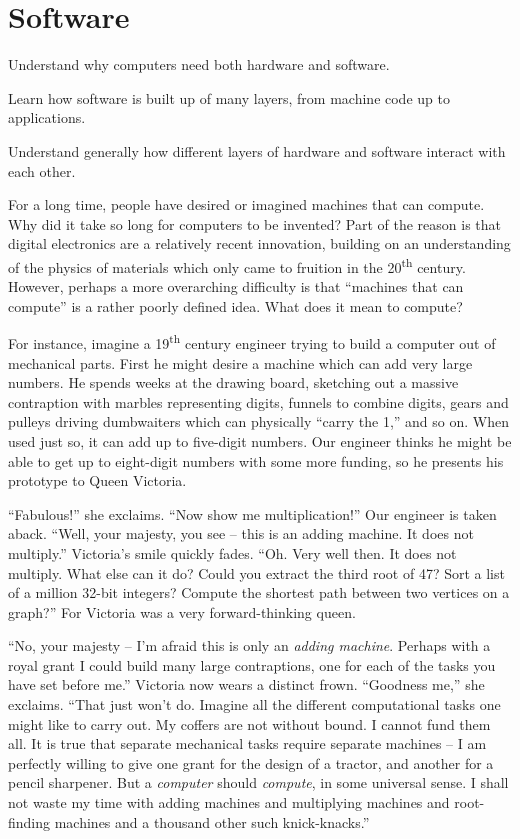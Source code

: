 \chapter{Software}\label{ch:hardware_software}

\begin{goals}
\item Understand why computers need both hardware and software.
\item Learn how software is built up of many layers, from machine code up to applications.
\item Understand generally how different layers of hardware and software interact with each other.
\end{goals}

For a long time, people have desired or imagined machines that can compute. Why did it take so long for computers to be invented? Part of the reason is that digital electronics are a relatively recent innovation, building on an understanding of the physics of materials which only came to fruition in the 20\textsuperscript{th} century. However, perhaps a more overarching difficulty is that ``machines that can compute'' is a rather poorly defined idea. What does it mean to compute?

For instance, imagine a 19\textsuperscript{th} century engineer trying to build a computer out of mechanical parts. First he might desire a machine which can add very large numbers. He spends weeks at the drawing board, sketching out a massive contraption with marbles representing digits, funnels to combine digits, gears and pulleys driving dumbwaiters which can physically ``carry the 1,'' and so on. When used just so, it can add up to five-digit numbers. Our engineer thinks he might be able to get up to eight-digit numbers with some more funding, so he presents his prototype to Queen Victoria.

``Fabulous!'' she exclaims. ``Now show me multiplication!'' Our engineer is taken aback. ``Well, your majesty, you see -- this is an adding machine. It does not multiply.'' Victoria's smile quickly fades. ``Oh. Very well then. It does not multiply. What else can it do? Could you extract the third root of 47? Sort a list of a million 32-bit integers? Compute the shortest path between two vertices on a graph?'' For Victoria was a very forward-thinking queen.

``No, your majesty -- I'm afraid this is only an \emph{adding machine}. Perhaps with a royal grant I could build many large contraptions, one for each of the tasks you have set before me.'' Victoria now wears a distinct frown. ``Goodness me,'' she exclaims. ``That just won't do. Imagine all the different computational tasks one might like to carry out. My coffers are not without bound. I cannot fund them all. It is true that separate mechanical tasks require separate machines -- I am perfectly willing to give one grant for the design of a tractor, and another for a pencil sharpener. But a \emph{computer} should \emph{compute}, in some universal sense. I shall not waste my time with adding machines and multiplying machines and root-finding machines and a thousand other such knick-knacks.''


